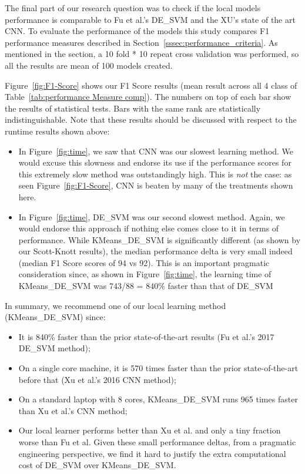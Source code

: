 \documentclass[sigconf]{acmart}
\newcommand{\bi}{\begin{itemize}[leftmargin=0.4cm]}
\newcommand{\ei}{\end{itemize}}
\theoremstyle{break}
\begin{document}
    The final part of our research question was to check if the local models performance is comparable to Fu et al.'s DE\_SVM and the XU's state of the art CNN. To evaluate the performance of the models this study compares F1 performance measures described in Section~\ref{sssec:performance_criteria}. As mentioned in the section, a 10 fold * 10 repeat cross validation was  performed, so all the results are mean of 100 models created. 
    
    Figure~\ref{fig:F1-Score} shows our  F1 Score results (mean result across
    all 4 class of Table~\ref{tab:performance Measure comp}). The numbers on top of each bar show the results of statistical tests. Bars with the same rank are statistically indistinguishable.
       Note that these results should be discussed with respect to the runtime results shown above:
       
       \bi
       
        \item
      In  Figure~\ref{fig:time}, we saw that  CNN was our  slowest learning method.
       We would excuse this slowness and endorse its use if the performance scores for this extremely slow method  was outstandingly high. This is {\em not} the case: as seen
       Figure~\ref{fig:F1-Score}, 
        CNN is beaten by many of the treatments shown here.
       \item
       In  Figure~\ref{fig:time},  DE\_SVM was our second slowest method. Again, we would endorse this approach if nothing else comes close to it in terms of performance.
       While KMeans\_DE\_SVM is significantly different (as shown by our Scott-Knott results), the median performance delta is very small indeed
       (median F1 Score scores of 94 vs 92). This is an important pragmatic
       consideration since, as shown in Figure~\ref{fig:time}, the learning time of 
       KMeans\_DE\_SVM  was  743/88 = 840\% faster than that of  DE\_SVM
       \ei
       
      \noindent In summary, we recommend one of our  local learning method (KMeans\_DE\_SVM) since:
       \bi
       \item It is 840\%   faster than the prior state-of-the-art results (Fu et al.'s 2017 DE\_SVM method);
       \item
       On a single core machine, it is 570 times faster
       than the prior state-of-the-art before that (Xu et al.'s 2016 CNN method);
       \item
       On a standard laptop with  8 cores, KMeans\_DE\_SVM  runs 965 times faster than Xu et al.'s CNN method;
       \item
       Our local learner performs better than Xu et al. and only a tiny fraction worse than Fu et al.   Given these small performance deltas,
            from a pragmatic engineering perspective,
              we find it hard to justify the extra computational cost of
               DE\_SVM over  KMeans\_DE\_SVM. 
       \ei
      
\end{document}
